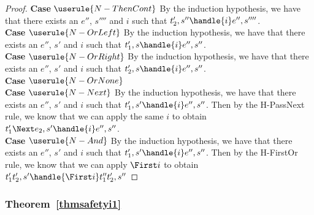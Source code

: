 \begin{proof}
  \noindent\textbf{Case} $\userule{N-ThenCont}$ By the induction hypothesis, we have that there exists an $e''$, $s''''$ and $i$ such that $t_2',s''\handle{i}e'',s''''$.\\

  \noindent\textbf{Case} $\userule{N-OrLeft}$ By the induction hypothesis, we have that there exists an $e''$, $s'$ and $i$ such that $t_1',s\handle{i}e'',s''$.\\

  \noindent\textbf{Case} $\userule{N-OrRight}$ By the induction hypothesis, we have that there exists an $e''$, $s'$ and $i$ such that $t_2',s\handle{i}e'',s''$.\\

  \noindent\textbf{Case} $\userule{N-OrNone}$ \todo{   }\\

  \noindent\textbf{Case} $\userule{N-Next}$ By the induction hypothesis, we have that there exists an $e''$, $s'$ and $i$ such that $t_1',s'\handle{i}e'',s''$. Then by the H-PassNext rule, we know that we can apply the same $i$ to obtain $t_1'\Next e_2,s'\handle{i}e'',s''$.\\

  \noindent\textbf{Case} $\userule{N-And}$ By the induction hypothesis, we have that there exists an $e''$, $s'$ and $i$ such that $t_1',s'\handle{i}e'',s''$. Then by the H-FirstOr rule, we know that we can apply $\First i$ to obtain $t_1'\And t_2',s'\handle{\First i} t_1''\And t_2',s''$

\end{proof}

\subsubsection{Theorem~\ref{thmsafetyi1}}

